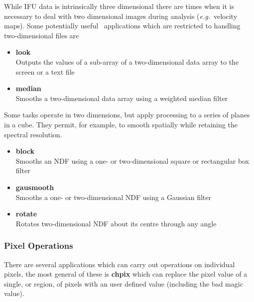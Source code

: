 \documentclass[twoside,11pt]{article}
\newcommand{\xref}[3]{#1}
\begin{document}
{While IFU data is intrinsically three dimensional there are times when
it is necessary to deal with two dimensional images during analysis
(\emph{e.g.}\ velocity maps).  Some potentially useful \KAPPA\
applications which are restricted to handling two-dimensional files
are

\begin{itemize}
\item{\xref{{\bf look}}{sun95}{LOOK}}\\
Outputs the values of a sub-array of a two-dimensional data array to the screen or a text file
\item{\xref{{\bf median}}{sun95}{MEDIAN}}\\ 
Smooths a two-dimensional data array using a weighted median filter 
\end{itemize}

Some tasks operate in two dimensions, but apply processing to a series
of planes in a cube.  They permit, for example, to smooth spatially
while retaining the spectral resolution.

\begin{itemize}
\item{\xref{{\bf block}}{sun95}{BLOCK}}\\
Smooths an NDF using a one- or two-dimensional square or rectangular box filter
\item{\xref{{\bf gausmooth}}{sun95}{GAUSMOOTH}}\\
Smooths a one- or two-dimensional NDF using a Gaussian filter
\item{\xref{{\bf rotate}}{sun95}{ROTATE}}\\
Rotates two-dimensional NDF about its centre through any angle 
\end{itemize}


\subsubsection{Pixel Operations}

There are several applications which can carry out operations on
individual pixels, the most general of these is \xref{{\bf
chpix}}{sun95}{CHPIX} which can replace the pixel value of a single,
or region, of pixels with an user defined value (including the bad
\xref{magic value}{sun95}{se_masking}).

}
\end{document}
